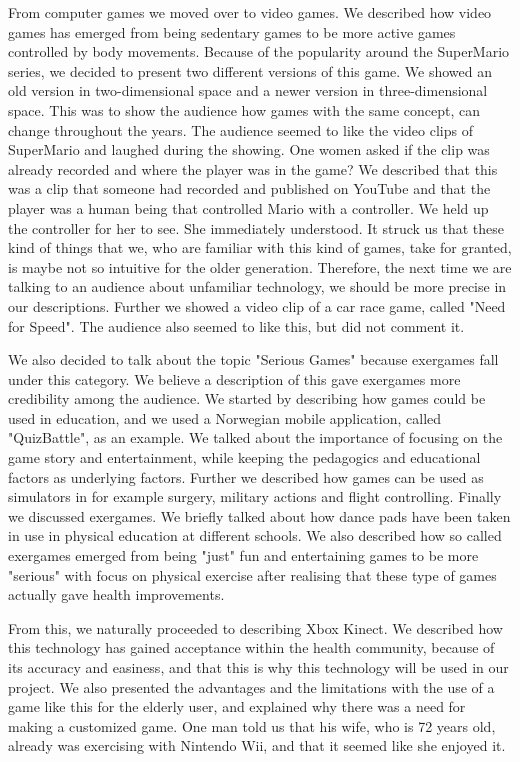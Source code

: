 From computer games we moved over to video games. We described how video games has emerged from being sedentary games to be more active games controlled by body movements. Because of the popularity around the SuperMario series, we decided to present two different versions of this game. We showed an old version in two-dimensional space and a newer version in three-dimensional space. This was to show the audience how games with the same concept, can change throughout the years. The audience seemed to like the video clips of SuperMario and laughed during the showing. One women asked if the clip was already recorded and where the player was in the game? We described that this was a clip that someone had recorded and published on YouTube and that the player was a human being that controlled Mario with a controller. We held up the controller for her to see. She immediately understood. It struck us that these kind of things that we, who are familiar with this kind of games, take for granted, is maybe not so intuitive for the older generation. Therefore, the next time we are talking to an audience about unfamiliar technology, we should be more precise in our descriptions. Further we showed a video clip of a car race game, called "Need for Speed". The audience also seemed to like this, but did not comment it. 

We also decided to talk about the topic "Serious Games" because exergames fall under this category. We believe a description of this gave exergames more credibility among the audience. We started by describing how games could be used in education, and we used a Norwegian mobile application, called "QuizBattle", as an example. We talked about the importance of focusing on the game story and entertainment, while keeping the pedagogics and educational factors as underlying factors. Further we described how games can be used as simulators in for example surgery, military actions and flight controlling. Finally we discussed exergames. We briefly talked about how dance pads have been taken in use in physical education at different schools. We also described how so called exergames emerged from being "just" fun and entertaining games to be more "serious" with focus on physical exercise after realising that these type of games actually gave health improvements.

From this, we naturally proceeded to describing Xbox Kinect. We described how this technology has gained acceptance within the health community, because of its accuracy and easiness, and that this is why this technology will be used in our project. We also presented the advantages and the limitations with the use of a  game like this for the elderly user, and explained why there was a need for making a customized game. One man told us that his wife, who is 72 years old, already was exercising with Nintendo Wii, and that it seemed like she enjoyed it.

